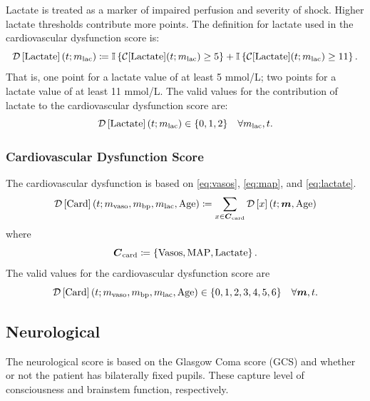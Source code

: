 \documentclass[letterpaper,10pt]{article}
\begin{document}
Lactate is treated as a marker of impaired perfusion and severity of shock.
Higher lactate thresholds contribute more points. The definition for lactate
used in the cardiovascular dysfunction score is:
\begin{equation}
  \label{eq:lactate}
  \DS{Lactate}[\m{lac}] \coloneqq
    \mathbb{I}\left\{\mathcal{C}[\mathrm{Lactate}](t;\m{lac}) \geq  5\right\} +
    \mathbb{I}\left\{\mathcal{C}[\mathrm{Lactate}](t;\m{lac}) \geq 11\right\}.
\end{equation}
That is, one point for a lactate value of at least 5 mmol/L; two points for a
lactate value of at least 11 mmol/L. The valid values for the contribution of
lactate to the cardiovascular dysfunction score are:
\begin{equation}
  \label{eq:lactate-valid-values}
  \DS{Lactate}[\m{lac}] \in \{0, 1, 2\} \quad \forall \m{lac},t.
\end{equation}

\subsubsection{Cardiovascular Dysfunction Score}\label{sec:card-odss}
The cardiovascular dysfunction is based on \eqref{eq:vasos}, \eqref{eq:map}, and
\eqref{eq:lactate}.
\begin{equation}
  \label{eq:card}
  \DS{Card}[\m{vaso}, \m{bp}, \m{lac}, \mathrm{Age}] \coloneqq
  \sum_{x \in \Ccard} \DS*{x}
\end{equation}
where
\begin{equation}
  \label{eq:card-component-set}
  \boldsymbol{C}_{\mathrm{card}} \coloneqq \left\{\mathrm{Vasos}, \mathrm{MAP}, \mathrm{Lactate}\right\}.
\end{equation}
The valid values for the cardiovascular dysfunction score are
\begin{equation}
  \label{eq:card-valid-values}
  \DS{Card}[\m{vaso}, \m{bp}, \m{lac}, \mathrm{Age}]
  \in \{0, 1, 2, 3, 4, 5, 6\} \quad \forall \boldsymbol{m},t.
\end{equation}

\subsection{Neurological}\label{sec:neuro}

The neurological score is based on the Glasgow Coma score (GCS) and
whether or not the patient has bilaterally fixed pupils. These capture
level of consciousness and brainstem function, respectively.
\end{document}
